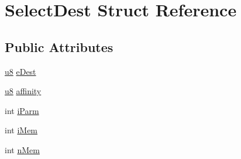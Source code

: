 \hypertarget{struct_select_dest}{\section{Select\-Dest Struct Reference}
\label{struct_select_dest}
}
\subsection*{Public Attributes}
\begin{DoxyCompactItemize}
\item 
\hyperlink{sqlite3_8c_a74a0f6424ae628af25f23f0a35f6ead3}{u8} \hyperlink{struct_select_dest_a779c1809acadd15898db0b20e31cc23f}{e\-Dest}
\item 
\hyperlink{sqlite3_8c_a74a0f6424ae628af25f23f0a35f6ead3}{u8} \hyperlink{struct_select_dest_a7a5b76f4fd40a1b84356fc58e0d6b173}{affinity}
\item 
int \hyperlink{struct_select_dest_a6ca726a6f8054df61baa150c5010c53f}{i\-Parm}
\item 
int \hyperlink{struct_select_dest_ab060aa655304afa76b1a2f923a2b0ae5}{i\-Mem}
\item 
int \hyperlink{struct_select_dest_a1868d637be46616a4206fd8ff9f4ac52}{n\-Mem}
\end{DoxyCompactItemize}


